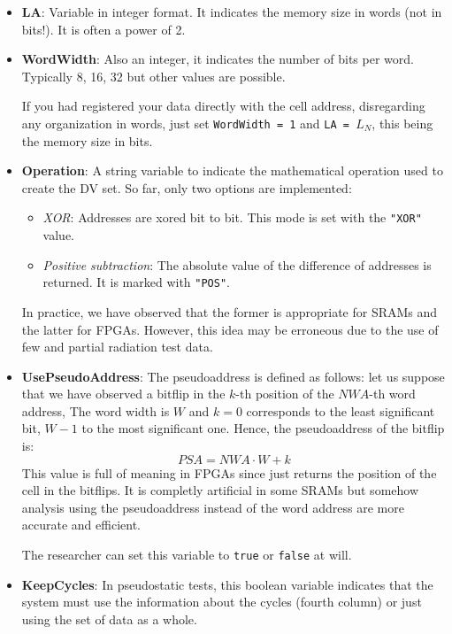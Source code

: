 \begin{itemize}
	\item \textbf{LA}: Variable in integer format. It indicates the memory size in words (not in bits!). It is often a power of 2.
	\item \textbf{WordWidth}: Also an integer, it indicates the number of bits per word. Typically 8, 16, 32 but other values are possible.
	
	If you had registered your data directly with the cell address, disregarding any organization in words, just set \texttt{WordWidth = 1} and \texttt{LA  = \(L_N\)}, this being the memory size in bits.
	
	\item \textbf{Operation}: A string variable to indicate the mathematical operation used to create the DV set. So far, only two options are implemented:
	\begin{itemize}
		\item \textit{XOR}: Addresses are xored bit to bit. This mode is set with the \texttt{"XOR"} value.
		\item \textit{Positive subtraction}: The absolute value of the difference of addresses is returned. It is marked with \texttt{"POS"}. 
	\end{itemize}

	In practice, we have observed that the former is appropriate for SRAMs and the latter for FPGAs. However, this idea may be erroneous due to the use of few and partial radiation test data.
	\item \textbf{UsePseudoAddress}: The pseudoaddress is defined as follows: let us suppose that we have observed a bitflip in the $k$-th position of the $NWA$-th word address, The word width is $W$ and $k=0$ corresponds to the least significant bit, $W-1$ to the most significant one. Hence, the pseudoaddress of the bitflip is:
	\begin{equation}
		PSA = NWA \cdot W + k
		\label{Eq:PseudoAddress}
	\end{equation}
	This value is full of meaning in FPGAs since just returns the position of the cell in the bitflips. It is completly artificial in some SRAMs but somehow analysis using the pseudoaddress instead of the word address are more accurate and efficient. 
	
	The researcher can set this variable to \texttt{true} or \texttt{false} at will.
	\item \textbf{KeepCycles}: In pseudostatic tests, this boolean variable indicates that the system must use the information about the cycles (fourth column) or just using the set of data as a whole. 
	

\end{itemize}
